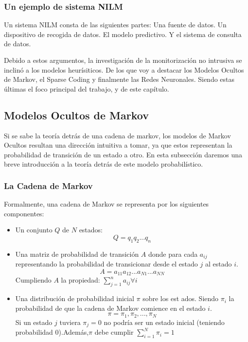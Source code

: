 \subsubsection{Un ejemplo de sistema NILM}
Un sistema NILM consta de las siguientes partes: Una fuente de datos. Un dispositivo de recogida de datos. El modelo predictivo. Y el sistema de consulta de datos.

Debido a estos argumentos, la investigación de la monitorización no intrusiva se inclinó a los modelos heurísiticos. De los que voy a destacar los Modelos Ocultos de Markov, el Sparse Coding y finalmente las Redes Neuronales. Siendo estas últimas el foco principal del trabajo, y de este capítulo. 

\subsection{Modelos Ocultos de Markov}
Si se sabe la teoría detrás de una cadena de markov, los modelos de Markov Ocultos resultan una dirección intuitiva a tomar, ya que estos representan la probabilidad de transición de un estado a otro. En esta subsección daremos una breve introducción a la teoría detrás de este modelo probabilístico.
\subsubsection{La Cadena de Markov}
Formalmente, una cadena de Markov se representa por los siguientes componentes:
\begin{center}
    \begin{itemize}
        \item Un conjunto $Q$ de $N$ estados: $$Q = q_1q_2...q_n$$
        \item Una matriz de probabilidad de transición $A$ donde para cada $a_{ij}$ representando la probabilidad de transicionar desde el estado $j$ al estado $i$. $$A=a_{11}a_{12}...a_{N1}...a_{NN}$$ 
        {\footnotesize Cumpliendo $A$ la propiedad: $\sum_{j=1}^n a_{ij} \forall{i}$}
        \item Una distribución de probabilidad inicial $\pi$ sobre los est
        ados. Siendo $\pi_i$ la probabilidad de que la cadena de Markov comience en el estado $i$. $$\pi=\pi_1,\pi_2, ...,\pi_N$$ 
        {\footnotesize Si un estado $j$ tuviera $\pi_j=0$ no podría ser un estado inicial (teniendo probabilidad $0$).\linebreak Además,$\pi$ debe cumplir $\sum_{i=1}^N \pi_i = 1$}
    \end{itemize} 
    \autocite{markovStandford}
\end{center}



